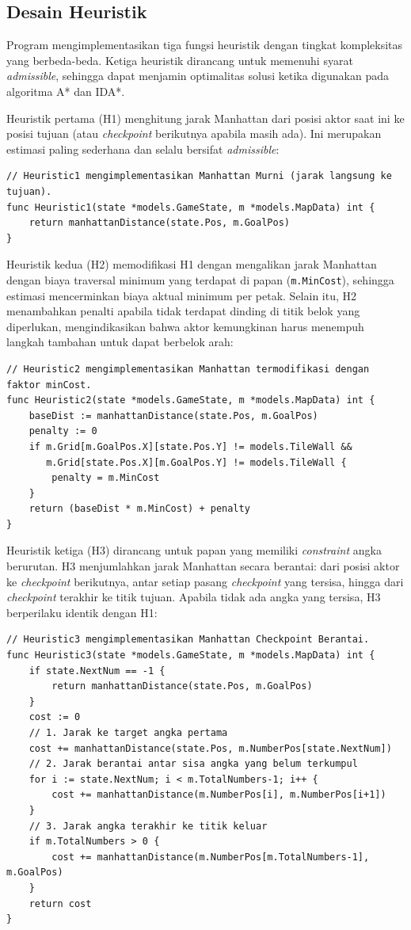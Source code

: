 \documentclass[12pt,a4paper]{article}
\begin{document}
\subsection{Desain Heuristik}
Program mengimplementasikan tiga fungsi heuristik dengan tingkat kompleksitas yang
berbeda-beda. Ketiga heuristik dirancang untuk memenuhi syarat \textit{admissible},
sehingga dapat menjamin optimalitas solusi ketika digunakan pada algoritma A* dan
IDA*.

Heuristik pertama (H1) menghitung jarak Manhattan dari posisi aktor saat ini ke
posisi tujuan (atau \textit{checkpoint} berikutnya apabila masih ada). Ini merupakan
estimasi paling sederhana dan selalu bersifat \textit{admissible}:
\begin{lstlisting}[style=go]
// Heuristic1 mengimplementasikan Manhattan Murni (jarak langsung ke tujuan).
func Heuristic1(state *models.GameState, m *models.MapData) int {
	return manhattanDistance(state.Pos, m.GoalPos)
}
\end{lstlisting}

Heuristik kedua (H2) memodifikasi H1 dengan mengalikan jarak Manhattan dengan biaya
traversal minimum yang terdapat di papan (\texttt{m.MinCost}), sehingga estimasi
mencerminkan biaya aktual minimum per petak. Selain itu, H2 menambahkan penalti
apabila tidak terdapat dinding di titik belok yang diperlukan, mengindikasikan
bahwa aktor kemungkinan harus menempuh langkah tambahan untuk dapat berbelok arah:
\begin{lstlisting}[style=go]
// Heuristic2 mengimplementasikan Manhattan termodifikasi dengan faktor minCost.
func Heuristic2(state *models.GameState, m *models.MapData) int {
	baseDist := manhattanDistance(state.Pos, m.GoalPos)
	penalty := 0
	if m.Grid[m.GoalPos.X][state.Pos.Y] != models.TileWall && 
	   m.Grid[state.Pos.X][m.GoalPos.Y] != models.TileWall {
		penalty = m.MinCost
	}
	return (baseDist * m.MinCost) + penalty
}
\end{lstlisting}

Heuristik ketiga (H3) dirancang untuk papan yang memiliki \textit{constraint}
angka berurutan. H3 menjumlahkan jarak Manhattan secara berantai: dari posisi
aktor ke \textit{checkpoint} berikutnya, antar setiap pasang \textit{checkpoint}
yang tersisa, hingga dari \textit{checkpoint} terakhir ke titik tujuan. Apabila
tidak ada angka yang tersisa, H3 berperilaku identik dengan H1:
\begin{lstlisting}[style=go]
// Heuristic3 mengimplementasikan Manhattan Checkpoint Berantai.
func Heuristic3(state *models.GameState, m *models.MapData) int {
	if state.NextNum == -1 {
		return manhattanDistance(state.Pos, m.GoalPos)
	}
	cost := 0
	// 1. Jarak ke target angka pertama
	cost += manhattanDistance(state.Pos, m.NumberPos[state.NextNum])
	// 2. Jarak berantai antar sisa angka yang belum terkumpul
	for i := state.NextNum; i < m.TotalNumbers-1; i++ {
		cost += manhattanDistance(m.NumberPos[i], m.NumberPos[i+1])
	}
	// 3. Jarak angka terakhir ke titik keluar
	if m.TotalNumbers > 0 {
		cost += manhattanDistance(m.NumberPos[m.TotalNumbers-1], m.GoalPos)
	}
	return cost
}
\end{lstlisting}
\end{document}
